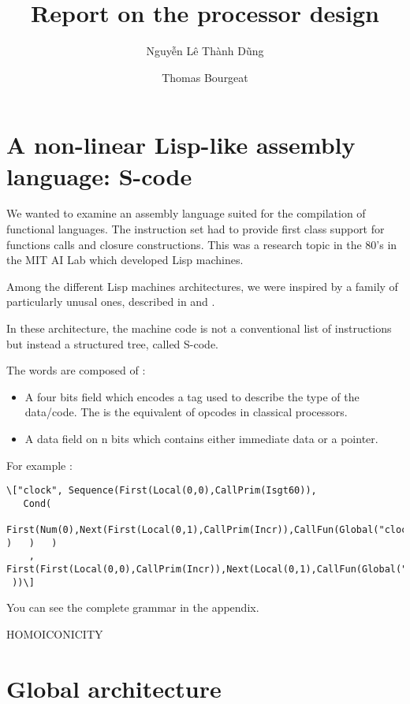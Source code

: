 \documentclass[a4paper, 11pt]{article}
\begin{document}
\title{Report on the processor design}
\author{Nguyễn Lê Thành Dũng \and Thomas Bourgeat}

\maketitle

\section{A non-linear Lisp-like assembly language: S-code}

We wanted to examine an assembly language suited for the compilation of
functional languages. The instruction set had to provide first class support for
 functions calls and closure constructions. This was a research topic in the
80's in the MIT AI Lab which developed Lisp machines.   

Among the different Lisp machines architectures, we were inspired by a family of particularly
unusal ones, described in \cite{Steele} and \cite{truc}.

In these architecture, the machine code is not a conventional list of
instructions but instead a structured tree, called S-code. 


The words are composed of :
\begin{itemize}
\item A four bits field which encodes a tag used to describe the type of the
data/code. The is the equivalent of opcodes in classical processors.
\item A data field on n bits which contains either immediate data or a pointer.
\end{itemize}

For example :

\begin{lstlisting}\["clock", Sequence(First(Local(0,0),CallPrim(Isgt60)),
   Cond(
    First(Num(0),Next(First(Local(0,1),CallPrim(Incr)),CallFun(Global("clock")
)   )   )   
    ,   
First(First(Local(0,0),CallPrim(Incr)),Next(Local(0,1),CallFun(Global("clock"))))
 ))\]
\end{lstlisting}


You can see the complete grammar in the appendix.

HOMOICONICITY


\section{Global architecture}
\end{document}
